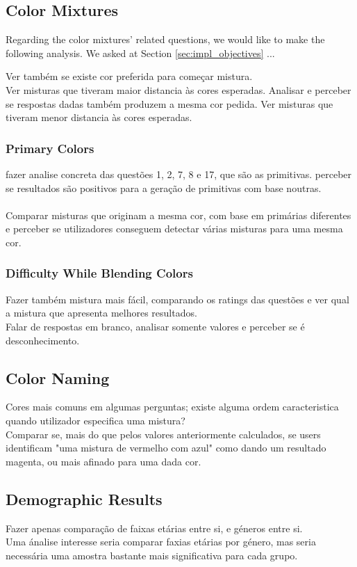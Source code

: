 \subsection{Color Mixtures}
\label{subsec:results_colormixtures}
%
Regarding the color mixtures' related questions, we would like to make the following analysis. We asked at Section \ref{sec:impl_objectives} ... \par
Ver também se existe cor preferida para começar mistura. \\
Ver misturas que tiveram maior distancia às cores esperadas. Analisar e perceber se respostas dadas também produzem a mesma cor pedida.
Ver misturas que tiveram menor distancia às cores esperadas.
%
\subsubsection{Primary Colors}
\label{subsubsec:primarycolors}
%
fazer analise concreta das questões 1, 2, 7, 8 e 17, que são as primitivas. perceber se resultados são positivos para a geração de primitivas com base noutras. \\\\
%
Comparar misturas que originam a mesma cor, com base em primárias diferentes e perceber se utilizadores conseguem detectar várias
misturas para uma mesma cor. \par
%
\subsubsection{Difficulty While Blending Colors}
\label{subsubsec:difficulty_rating}
%
Fazer também mistura mais fácil, comparando os ratings das questões e ver qual a mistura que apresenta melhores resultados. \\
Falar de respostas em branco, analisar somente valores e perceber se é desconhecimento. \par
%
\subsection{Color Naming}
\label{subsec:results_namingcolors}
%
Cores mais comuns em algumas perguntas; existe alguma ordem caracteristica quando utilizador especifica uma mistura? \\
Comparar se, mais do que pelos valores anteriormente calculados, se users identificam "uma mistura de vermelho com azul" como dando um resultado
magenta, ou mais afinado para uma dada cor.
%
\subsection{Demographic Results}
\label{subsec:results_demographic}
%
Fazer apenas comparação de faixas etárias entre si, e géneros entre si. \\
Uma ánalise interesse seria comparar faxias etárias por género, mas seria necessária uma amostra bastante mais significativa para cada grupo.
%
